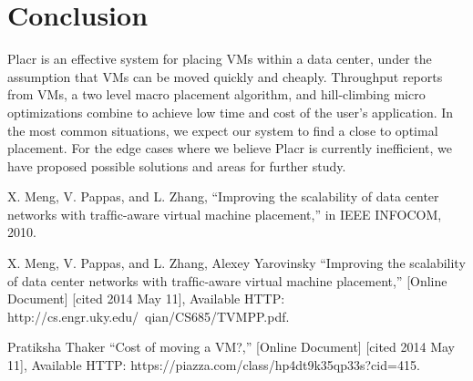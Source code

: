 \documentclass[11pt]{article}
\begin{document}
\section{Conclusion}

Placr is an effective system for placing VMs within a data center, under the assumption that VMs can be moved quickly and cheaply.  Throughput reports from VMs, a two level macro placement algorithm, and hill-climbing micro optimizations combine to achieve low time and cost of the user's application.  In the most common situations, we expect our system to find a close to optimal placement. For the edge cases where we believe Placr is currently inefficient, we have proposed possible solutions and areas for further study.



\begin{thebibliography}{9}

  X. Meng, V. Pappas, and L. Zhang, ``Improving the scalability of data
center networks with trafﬁc-aware virtual machine placement,'' in IEEE
INFOCOM, 2010.

X. Meng, V. Pappas, and L. Zhang, Alexey Yarovinsky ``Improving the scalability of data
center networks with trafﬁc-aware virtual machine placement,'' [Online Document] [cited 2014 May 11], Available HTTP: http://cs.engr.uky.edu/~qian/CS685/TVMPP.pdf.

 Pratiksha Thaker ``Cost of moving a VM?,'' [Online Document] [cited 2014 May 11], Available HTTP: https://piazza.com/class/hp4dt9k35qp33s?cid=415.

\end{thebibliography}
\end{document}
